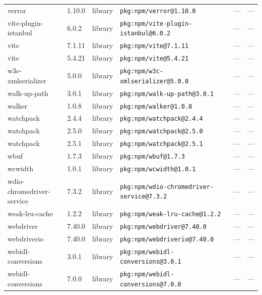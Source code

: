 \documentclass[11pt,a4paper]{article}
\begin{document}
\begin{longtable}{|p{4cm}|p{2cm}|p{1.6cm}|p{5cm}|p{1.5cm}|p{3.5cm}|}
\raggedright verror & 1.10.0 & library & \small\texttt{pkg:npm/verror@1.10.0} & — & \small — \\
\raggedright vite-plugin-istanbul & 6.0.2 & library & \small\texttt{pkg:npm/vite-plugin-istanbul@6.0.2} & — & \small — \\
\raggedright vite & 7.1.11 & library & \small\texttt{pkg:npm/vite@7.1.11} & — & \small — \\
\raggedright vite & 5.4.21 & library & \small\texttt{pkg:npm/vite@5.4.21} & — & \small — \\
\raggedright w3c-xmlserializer & 5.0.0 & library & \small\texttt{pkg:npm/w3c-xmlserializer@5.0.0} & — & \small — \\
\raggedright walk-up-path & 3.0.1 & library & \small\texttt{pkg:npm/walk-up-path@3.0.1} & — & \small — \\
\raggedright walker & 1.0.8 & library & \small\texttt{pkg:npm/walker@1.0.8} & — & \small — \\
\raggedright watchpack & 2.4.4 & library & \small\texttt{pkg:npm/watchpack@2.4.4} & — & \small — \\
\raggedright watchpack & 2.5.0 & library & \small\texttt{pkg:npm/watchpack@2.5.0} & — & \small — \\
\raggedright watchpack & 2.5.1 & library & \small\texttt{pkg:npm/watchpack@2.5.1} & — & \small — \\
\raggedright wbuf & 1.7.3 & library & \small\texttt{pkg:npm/wbuf@1.7.3} & — & \small — \\
\raggedright wcwidth & 1.0.1 & library & \small\texttt{pkg:npm/wcwidth@1.0.1} & — & \small — \\
\raggedright wdio-chromedriver-service & 7.3.2 & library & \small\texttt{pkg:npm/wdio-chromedriver-service@7.3.2} & — & \small — \\
\raggedright weak-lru-cache & 1.2.2 & library & \small\texttt{pkg:npm/weak-lru-cache@1.2.2} & — & \small — \\
\raggedright webdriver & 7.40.0 & library & \small\texttt{pkg:npm/webdriver@7.40.0} & — & \small — \\
\raggedright webdriverio & 7.40.0 & library & \small\texttt{pkg:npm/webdriverio@7.40.0} & — & \small — \\
\raggedright webidl-conversions & 3.0.1 & library & \small\texttt{pkg:npm/webidl-conversions@3.0.1} & — & \small — \\
\raggedright webidl-conversions & 7.0.0 & library & \small\texttt{pkg:npm/webidl-conversions@7.0.0} & — & \small — \\

\end{longtable}
\end{document}
